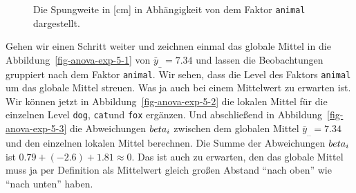 \documentclass[
  letterpaper,
]{scrbook}
\begin{document}
\begin{figure}
\begin{minipage}[t]{0.33\linewidth}
{{}

}

\end{minipage}%

\caption{\label{fig-anova-exp-1}Die Spungweite in {[}cm{]} in
Abhängigkeit von dem Faktor \texttt{animal} dargestellt.}

\end{figure}

Gehen wir einen Schritt weiter und zeichnen einmal das globale Mittel in
die Abbildung~\ref{fig-anova-exp-5-1} von \(\bar{y}_{..} = 7.34\) und
lassen die Beobachtungen gruppiert nach dem Faktor \texttt{animal}. Wir
sehen, dass die Level des Faktors \texttt{animal} um das globale Mittel
streuen. Was ja auch bei einem Mittelwert zu erwarten ist. Wir können
jetzt in Abbildung~\ref{fig-anova-exp-5-2} die lokalen Mittel für die
einzelnen Level \texttt{dog}, \texttt{cat}und \texttt{fox} ergänzen. Und
abschließend in Abbildung~\ref{fig-anova-exp-5-3} die Abweichungen
\(\\beta_i\) zwischen dem globalen Mittel \(\bar{y}_{..} = 7.34\) und
den einzelnen lokalen Mittel berechnen. Die Summe der Abweichungen
\(\\beta_i\) ist \(0.79 + (-2.6) + 1.81 \approx 0\). Das ist auch zu
erwarten, den das globale Mittel muss ja per Definition als Mittelwert
gleich großen Abstand ``nach oben'' wie ``nach unten'' haben.
\end{document}
